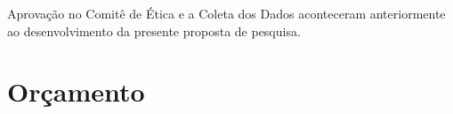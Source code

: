 \documentclass[chapter=TITLE,
               oneside,
               12pt,
               a4paper,
               english,
               brazil]{abntex2}    %
\begin{document}
    \begin{table}[H]
        \caption{Cronograma do Projeto em Meses -- Junho de 2020 à Maio de 2021}
        \begin{threeparttable}
        \renewcommand{\TPTminimum}{\linewidth}
            \begin{tablenotes}
              \footnotesize
              \item Aprovação no Comitê de Ética e a Coleta dos Dados aconteceram
              anteriormente ao desenvolvimento da presente proposta de pesquisa.
            \end{tablenotes}
        \end{threeparttable}
    \end{table}%

\section{Orçamento}\label{sec:orcamento}
\end{document}

